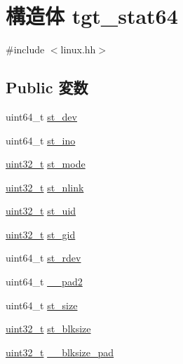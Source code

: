 \hypertarget{structPowerLinux_1_1tgt__stat64}{
\section{構造体 tgt\_\-stat64}
\label{structPowerLinux_1_1tgt__stat64}
}


{\ttfamily \#include $<$linux.hh$>$}\subsection*{Public 変数}
\begin{DoxyCompactItemize}
\item 
uint64\_\-t \hyperlink{structPowerLinux_1_1tgt__stat64_a0146849d3da5c91d9776888b14b82dcc}{st\_\-dev}
\item 
uint64\_\-t \hyperlink{structPowerLinux_1_1tgt__stat64_abb54f0e7d91659ba9f4ab77a5392c08a}{st\_\-ino}
\item 
\hyperlink{Type_8hh_a435d1572bf3f880d55459d9805097f62}{uint32\_\-t} \hyperlink{structPowerLinux_1_1tgt__stat64_a75f55d064ed3b380b0315de36e178885}{st\_\-mode}
\item 
\hyperlink{Type_8hh_a435d1572bf3f880d55459d9805097f62}{uint32\_\-t} \hyperlink{structPowerLinux_1_1tgt__stat64_ab77c257c135fa586e930ef0bf0977c08}{st\_\-nlink}
\item 
\hyperlink{Type_8hh_a435d1572bf3f880d55459d9805097f62}{uint32\_\-t} \hyperlink{structPowerLinux_1_1tgt__stat64_ad5477a292a4edf27aa5766e01e0f5d1f}{st\_\-uid}
\item 
\hyperlink{Type_8hh_a435d1572bf3f880d55459d9805097f62}{uint32\_\-t} \hyperlink{structPowerLinux_1_1tgt__stat64_a1faa6012541b83fd5218e2b229f876ec}{st\_\-gid}
\item 
uint64\_\-t \hyperlink{structPowerLinux_1_1tgt__stat64_ac430407fd3b0e421da1ee8f66c95a786}{st\_\-rdev}
\item 
uint64\_\-t \hyperlink{structPowerLinux_1_1tgt__stat64_a299cd1552af5b5b42cdf143598717ab2}{\_\-\_\-pad2}
\item 
uint64\_\-t \hyperlink{structPowerLinux_1_1tgt__stat64_ae9a97f03571901a066d512b87bc36dba}{st\_\-size}
\item 
\hyperlink{Type_8hh_a435d1572bf3f880d55459d9805097f62}{uint32\_\-t} \hyperlink{structPowerLinux_1_1tgt__stat64_a952cc52eb5efd16f9cebffe863823593}{st\_\-blksize}
\item 
\hyperlink{Type_8hh_a435d1572bf3f880d55459d9805097f62}{uint32\_\-t} \hyperlink{structPowerLinux_1_1tgt__stat64_a02d944611d1bf7057fbdf1d2f015ba8b}{\_\-\_\-blksize\_\-pad}

\end{DoxyCompactItemize}
